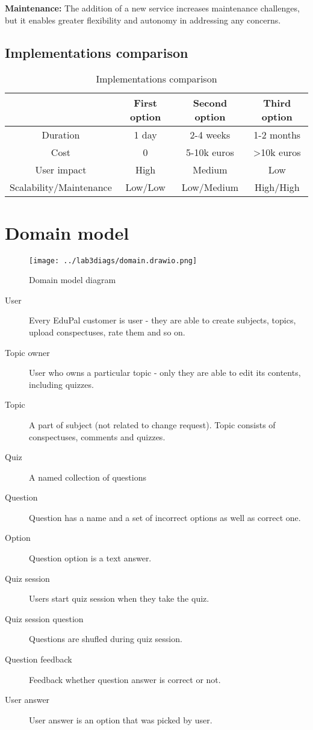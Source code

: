 \documentclass[
    english, %
]{VUMIFPSkursinis}
\begin{document}
\textbf{Maintenance:} The addition of a new service increases maintenance challenges, but it enables greater flexibility and autonomy in addressing any concerns.

\subsection{Implementations comparison}

\begin{table}[H]
    \centering
    \begin{tabular}{|c|c|c|c|}
        \hline
        & First option & Second option & Third option \\
        \hline
        Duration & 1 day & 2-4 weeks & 1-2 months \\
        \hline
        Cost & 0 & 5-10k euros & >10k euros \\
        \hline
        User impact & High & Medium & Low \\
        \hline
        Scalability/Maintenance & Low/Low & Low/Medium & High/High \\
        \hline
    \end{tabular}
    \caption{Implementations comparison}
    \label{tab:implementations-comparison}
\end{table}

\section{Domain model}

\begin{figure}[ht]
    \centering
    \texttt{[image: ../lab3diags/domain.drawio.png]}
    \caption{Domain model diagram}
    \label{domain-model}
\end{figure}

\begin{description}
    \item[User] Every EduPal customer is user - they are able to create subjects, topics, upload conspectuses, rate them and so on.
    \item[Topic owner] User who owns a particular topic - only they are able to edit its contents, including quizzes.
    \item[Topic] A part of subject (not related to change request). Topic consists of conspectuses, comments and quizzes.
    \item[Quiz] A named collection of questions
    \item[Question] Question has a name and a set of incorrect options as well as correct one.
    \item[Option] Question option is a text answer.
    \item[Quiz session] Users start quiz session when they take the quiz.
    \item[Quiz session question] Questions are shufled during quiz session.
    \item[Question feedback] Feedback whether question answer is correct or not.
    \item[User answer] User answer is an option that was picked by user.
\end{description}
\end{document}

